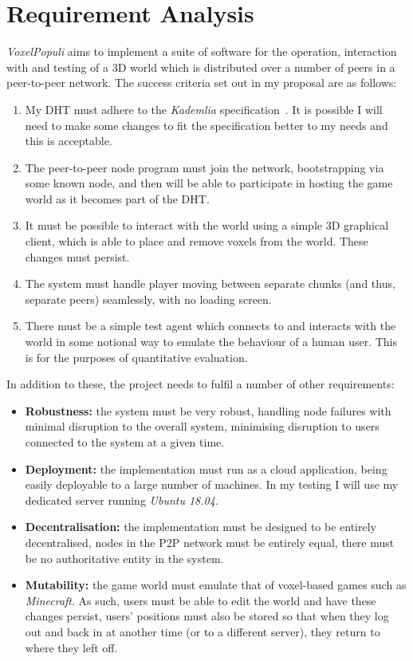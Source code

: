 \documentclass[12pt,notitlepage,a4paper]{report}
\newcommand{\kademlia}{\emph{Kademlia}}
\newcommand{\voxpop}{\emph{VoxelPopuli}}
\begin{document}
	\section{Requirement Analysis}
	\label{sec:req}
	\voxpop{} aims to implement a suite of software for the operation, interaction with and testing of a 3D world which is distributed over a number of peers in a peer-to-peer network. The success criteria set out in my proposal are as follows:
	
	\begin{enumerate}
		\item My DHT must adhere to the \kademlia{} specification~\cite{kademlia}. It is possible I will need to make some changes to fit the specification better to my needs and this is acceptable.
		\item The peer-to-peer node program must join the network, bootstrapping via some known node, and then will be able to participate in hosting the game world as it becomes part of the DHT.
		\item It must be possible to interact with the world using a simple 3D graphical client, which is able to place and remove voxels from the world. These changes must persist.
		\item The system must handle player moving between separate chunks (and thus, separate peers) seamlessly, with no loading screen.
		\item There must be a simple test agent which connects to and interacts with the world in some notional way to emulate the behaviour of a human user. This is for the purposes of quantitative evaluation.
	\end{enumerate}

	In addition to these, the project needs to fulfil a number of other requirements:
	
	\begin{itemize}
		\item \textbf{Robustness:} the system must be very robust, handling node failures with minimal disruption to the overall system, minimising disruption to users connected to the system at a given time.
		\item \textbf{Deployment:} the implementation must run as a cloud application, being easily deployable to a large number of machines. In my testing I will use my dedicated server running \emph{Ubuntu 18.04}.
		\item \textbf{Decentralisation:} the implementation must be designed to be entirely decentralised, nodes in the P2P network must be entirely equal, there must be no authoritative entity in the system.
		\item \textbf{Mutability:} the game world must emulate that of voxel-based games such as \emph{Minecraft}. As such, users must be able to edit the world and have these changes persist, users' positions must also be stored so that when they log out and back in at another time (or to a different server), they return to where they left off.
	\end{itemize}
\end{document}
